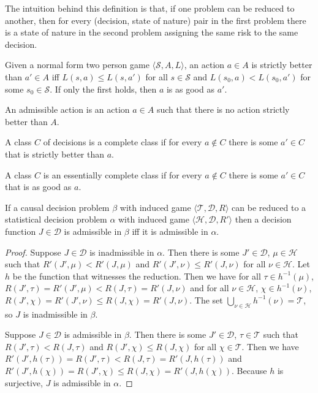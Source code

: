 The intuition behind this definition is that, if one problem can be reduced to another, then for every (decision, state of nature) pair in the first problem there is a state of nature in the second problem assigning the same risk to the same decision.

\begin{definition}
Given a normal form two person game $\langle \mathscr{S}, A, L\rangle$, an action $a\in A$ is strictly better than $a'\in A$ iff $L(s,a)\leq L(s,a')$ for all $s\in\mathscr{S}$ and $L(s_0,a)<L(s_0,a')$ for some $s_0\in \mathscr{S}$. If only the first holds, then $a$ is as good as $a'$.

An admissible action is an action $a\in A$ such that there is no action strictly better than $A$.
\end{definition}

\begin{definition}
A class $C$ of decisions is a complete class if for every $a\not\in C$ there is some $a'\in C$ that is strictly better than $a$.

A class $C$ is an essentially complete class if for every $a\not\in C$ there is some $a'\in C$ that is as good as $a$.
\end{definition}

\begin{lemma}
If a causal decision problem $\beta$ with induced game $\langle \mathscr{T},\mathscr{D}, R\rangle$ can be reduced to a statistical decision problem $\alpha$ with induced game $\langle \mathscr{H},\mathscr{D},R' \rangle$ then a decision function $J\in \mathscr{D}$ is admissible in $\beta$ iff it is admissible in $\alpha$.
\end{lemma}


\begin{proof}
Suppose $J\in\mathscr{D}$ is inadmissible in $\alpha$. Then there is some $J'\in\mathscr{D}$, $\mu\in\mathscr{H}$ such that $R'(J',\mu)<R'(J,\mu)$ and $R'(J',\nu)\leq R'(J,\nu)$ for all $\nu\in \mathscr{H}$. Let $h$ be the function that witnesses the reduction. Then we have for all $\tau\in h^{-1}(\mu)$, $R(J',\tau)=R'(J',\mu)<R(J,\tau)=R'(J,\nu)$ and for all $\nu\in \mathscr{H}$, $\chi\in h^{-1}(\nu)$, $R(J',\chi)=R'(J',\nu)\leq R(J,\chi)=R'(J,\nu)$. The set $\bigcup_{\nu\in\mathscr{H}} h^{-1}(\nu)=\mathscr{T}$, so $J$ is inadmissible in $\beta$.

Suppose $J\in \mathscr{D}$ is admissible in $\beta$. Then there is some $J'\in\mathscr{D}$, $\tau\in\mathscr{T}$ such that $R(J',\tau)<R(J,\tau)$ and $R(J',\chi)\leq R(J,\chi)$ for all $\chi\in \mathscr{T}$. Then we have $R'(J',h(\tau))=R(J',\tau)<R(J,\tau)=R'(J,h(\tau))$ and $R'(J',h(\chi))=R(J',\chi)\leq R(J,\chi)=R'(J,h(\chi))$. Because $h$ is surjective, $J$ is admissible in $\alpha$.
\end{proof}

